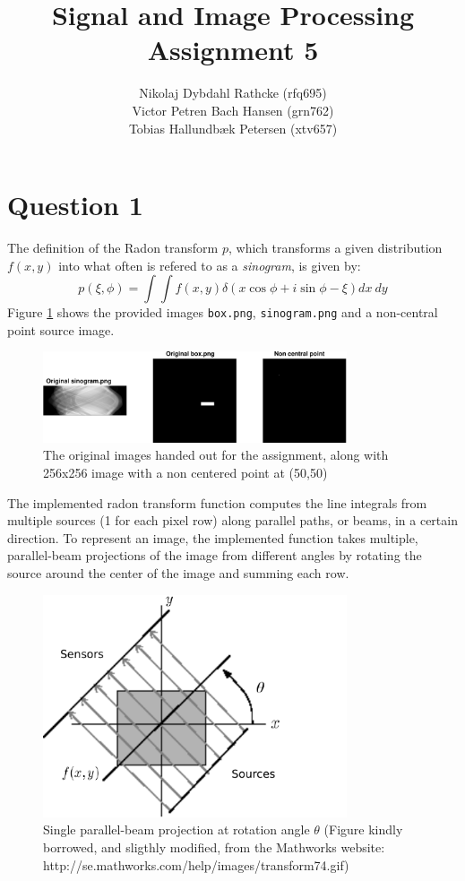 \documentclass[a4paper]{article}
\author{Nikolaj Dybdahl Rathcke (rfq695) \\
        Victor Petren Bach Hansen (grn762) \\
        Tobias Hallundbæk Petersen (xtv657) }
\title{Signal and Image Processing \\ Assignment 5}
\begin{document}
\maketitle

\section*{Question 1}
The definition of the Radon transform $p$, which transforms a given distribution $f(x,y)$ into what often is refered to as a \textit{sinogram}, is given by:
$$
  p(\xi, \phi) = \int \int f(x,y) \delta (x\cos \phi + i\sin \phi - \xi)dx\: dy
$$
Figure \ref{1a} shows the provided images \texttt{box.png}, \texttt{sinogram.png} and a non-central point source image.
\begin{figure}[H]
  \centering
  \includegraphics[width=0.8\textwidth]{./1a.pdf}
  \caption{The original images handed out for the assignment, along with 256x256 image with a non centered point at (50,50)}
  \label{1a}
\end{figure}
The implemented radon transform function computes the line integrals from multiple sources (1 for each pixel row) along parallel paths, or beams, in a certain direction. To represent an image, the implemented function takes multiple, parallel-beam projections of the image from different angles by rotating the source around the center of the image and summing each row.
\begin{figure}[H]
  \centering
  \includegraphics[width=0.8\textwidth]{./1c.pdf}
  \caption[Caption for LOF]%
    {Single parallel-beam projection at rotation angle $\theta$ (Figure kindly borrowed, and sligthly modified, from the Mathworks website: http://se.mathworks.com/help/images/transform74.gif)}
  \label{1c}
\end{figure}
\end{document}
